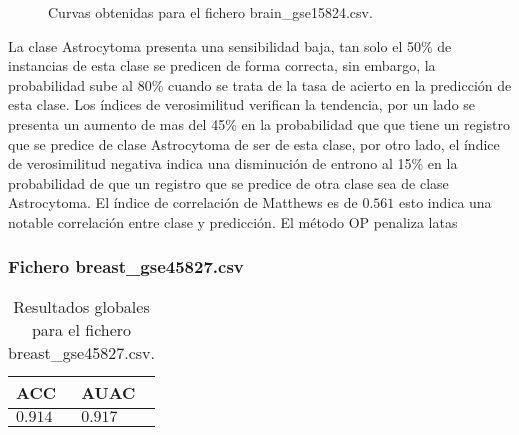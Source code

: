 \clearpage

\begin{figure}[htp]
    \centering
    \caption{Curvas obtenidas para el fichero brain\_gse15824.csv.}
    \label{fig:10}
\end{figure}

\bigbreak

La clase Astrocytoma presenta una sensibilidad baja, tan solo el 50\% de instancias de esta clase se predicen de forma correcta, sin embargo, la probabilidad sube al 80\% cuando se trata de la tasa de acierto en la predicción de esta clase. Los índices de verosimilitud verifican la tendencia, por un lado se presenta un aumento de mas del 45\% en la probabilidad que que tiene un registro que se predice de clase Astrocytoma de ser de esta clase, por otro lado, el  índice de verosimilitud negativa indica una disminución de entrono al 15\% en la probabilidad de que un registro que se predice de otra clase sea de clase Astrocytoma. El índice de correlación de Matthews es de $0.561$ esto indica una notable correlación entre clase y predicción. El método OP penaliza latas

\clearpage


\subsubsection{Fichero breast\_gse45827.csv}

\begin{table}[htp]
    \small
    \centering
    \begin{tabularx}{\columnwidth}{Y Y}
        ACC       & AUAC    \\\hline
        $0.914$   & $0.917$ \\\hline
    \end{tabularx}
    \caption{Resultados globales para el fichero breast\_gse45827.csv.}
    \label{tab:12}
\end{table}

